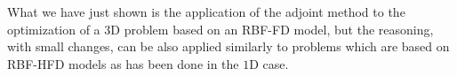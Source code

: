 \smallskip
What we have just shown is the application of the adjoint method to the optimization of a $3$D problem based on an RBF-FD model, but the reasoning, with small changes, can be also applied similarly to problems which are based on RBF-HFD models as has been done in the $1$D case.

%	








